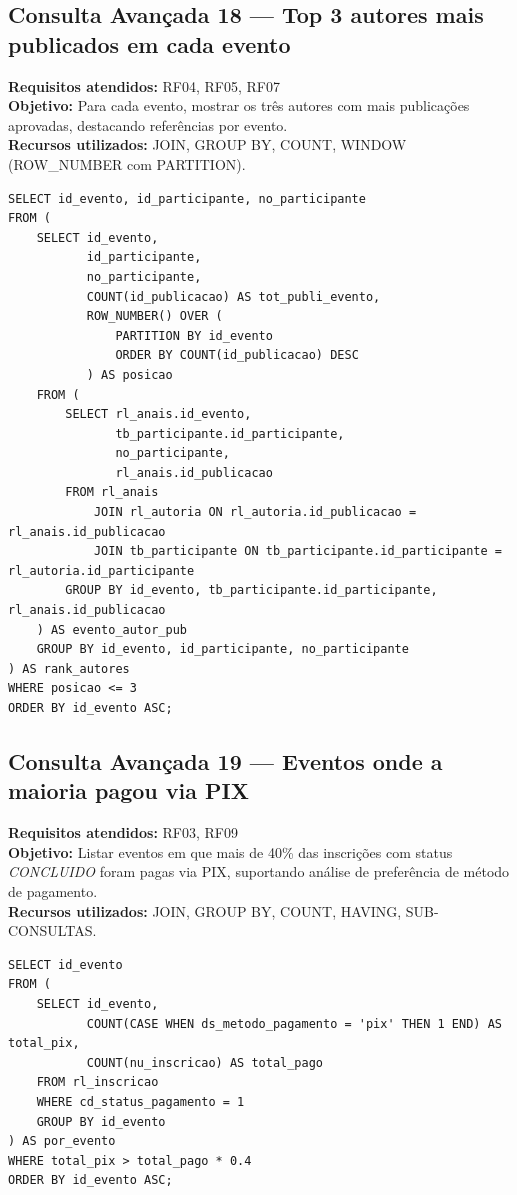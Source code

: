 \documentclass[12pt]{article}
\begin{document}
\subsection{Consulta Avançada 18 --- Top 3 autores mais publicados em cada evento}
\textbf{Requisitos atendidos:} RF04, RF05, RF07 \\
\textbf{Objetivo:} Para cada evento, mostrar os três autores com mais publicações aprovadas, destacando referências por evento. \\
\textbf{Recursos utilizados:} JOIN, GROUP BY, COUNT, WINDOW (ROW\_NUMBER com PARTITION).
\begin{lstlisting}[caption={QA18 --- Top 3 autores mais publicados em cada evento.}]
SELECT id_evento, id_participante, no_participante
FROM (
    SELECT id_evento,
           id_participante,
           no_participante,
           COUNT(id_publicacao) AS tot_publi_evento,
           ROW_NUMBER() OVER (
               PARTITION BY id_evento
               ORDER BY COUNT(id_publicacao) DESC
           ) AS posicao
    FROM (
        SELECT rl_anais.id_evento,
               tb_participante.id_participante,
               no_participante,
               rl_anais.id_publicacao
        FROM rl_anais
            JOIN rl_autoria ON rl_autoria.id_publicacao = rl_anais.id_publicacao
            JOIN tb_participante ON tb_participante.id_participante = rl_autoria.id_participante
        GROUP BY id_evento, tb_participante.id_participante, rl_anais.id_publicacao
    ) AS evento_autor_pub
    GROUP BY id_evento, id_participante, no_participante
) AS rank_autores
WHERE posicao <= 3
ORDER BY id_evento ASC;
\end{lstlisting}

\subsection{Consulta Avançada 19 --- Eventos onde a maioria pagou via PIX}
\textbf{Requisitos atendidos:} RF03, RF09 \\
\textbf{Objetivo:} Listar eventos em que mais de 40\% das inscrições com status \textit{CONCLUIDO} foram pagas via PIX, suportando análise de preferência de método de pagamento. \\
\textbf{Recursos utilizados:} JOIN, GROUP BY, COUNT, HAVING, SUB-CONSULTAS.
\begin{lstlisting}[caption={QA19 --- Eventos onde mais de 40\% pagaram via PIX.}]
SELECT id_evento
FROM (
    SELECT id_evento,
           COUNT(CASE WHEN ds_metodo_pagamento = 'pix' THEN 1 END) AS total_pix,
           COUNT(nu_inscricao) AS total_pago
    FROM rl_inscricao
    WHERE cd_status_pagamento = 1
    GROUP BY id_evento
) AS por_evento
WHERE total_pix > total_pago * 0.4
ORDER BY id_evento ASC;
\end{lstlisting}
\end{document}
